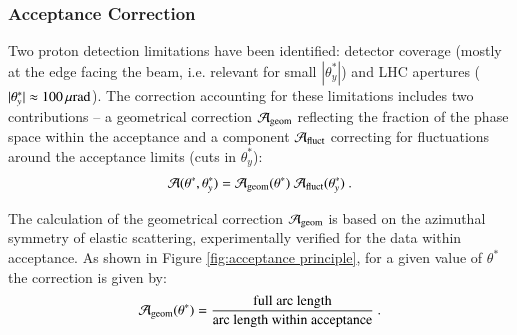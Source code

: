 
\subsubsection{Acceptance Correction}
\label{sec:acc corr}

Two proton detection limitations have been identified: detector coverage (mostly at the edge facing the beam, i.e. relevant for small $|\theta_y^*|$) and LHC apertures ($|\theta_y^*| \approx 100\,{\rm \mu rad}$). The correction accounting for these limitations includes two contributions -- a geometrical correction ${\cal A}_{\rm geom}$ reflecting the fraction of the phase space within the acceptance and a component ${\cal A}_{\rm fluct}$ correcting for fluctuations around the acceptance limits (cuts in $\theta_y^*$):
\begin{equation}
{\cal A}(\theta^*, \theta_y^*) = {\cal A}_{\rm geom}(\theta^*)\ {\cal A}_{\rm fluct}(\theta_y^*)\ .
\end{equation}

The calculation of the geometrical correction ${\cal A}_{\rm geom}$ is based on the azimuthal symmetry of elastic scattering, experimentally verified for the data within acceptance. As shown in Figure \ref{fig:acceptance principle}, for a given value of $\theta^*$ the correction is given by:
\begin{equation}
\label{eq:acc geom}
{\cal A_{\rm geom}}(\theta^*) = {
	\hbox{full arc length}\over 
	\hbox{arc length within acceptance}
} \ .
\end{equation}


